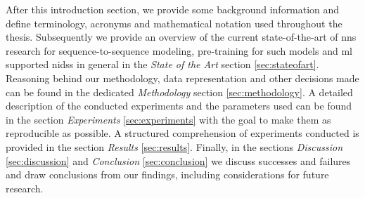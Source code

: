 After this introduction section, we provide some background information and define terminology, acronyms and mathematical notation used throughout the thesis. Subsequently we provide an overview of the current state-of-the-art of \glspl{nn} research for sequence-to-sequence modeling, pre-training for such models and \gls{ml} supported \glspl{nids} in general in the \textit{State of the Art} section \ref{sec:stateofart}. Reasoning behind our methodology, data representation and other decisions made can be found in the dedicated \textit{Methodology} section \ref{sec:methodology}. A detailed description of the conducted experiments and the parameters used can be found in the section \textit{Experiments} \ref{sec:experiments} with the goal to make them as reproducible as possible. A structured comprehension of experiments conducted is provided in the section \textit{Results} \ref{sec:results}. Finally, in the sections \textit{Discussion} \ref{sec:discussion} and \textit{Conclusion} \ref{sec:conclusion} we discuss successes and failures and draw conclusions from our findings, including considerations for future research. 


\newpage